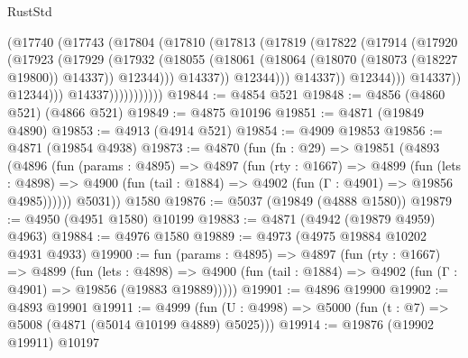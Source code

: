 \begin{lexlean}{RustStd}
\begin{coremodule}
                                  (@17740
                                    (@17743
                                      (@17804
                                        (@17810
                                          (@17813
                                            (@17819
                                              (@17822
                                                (@17914
                                                  (@17920
                                                    (@17923
                                                      (@17929
                                                        (@17932
                                                          (@18055
                                                            (@18061
                                                              (@18064
                                                                (@18070
                                                                  (@18073 (@18227 @19800))
                                                                  @14337))
                                                              @12344)))
                                                        @14337))
                                                    @12344)))
                                              @14337))
                                          @12344)))
                                    @14337))
                                @12344)))
                          @14337)))))))))))
@19844 := @4854 @521
@19848 := @4856 (@4860 @521) (@4866 @521)
@19849 := @4875 @10196
@19851 := @4871 (@19849 @4890)
@19853 := @4913 (@4914 @521)
@19854 := @4909 @19853
@19856 := @4871 (@19854 @4938)
@19873 := @4870
    (fun (fn : @29) =>
    @19851
      (@4893
        (@4896
          (fun (params : @4895) =>
          @4897
            (fun (rty : @1667) =>
            @4899
              (fun (lets : @4898) =>
              @4900 (fun (tail : @1884) => @4902 (fun (Γ : @4901) => @19856 @4985))))))
        @5031))
    @1580
@19876 := @5037 (@19849 (@4888 @1580))
@19879 := @4950 (@4951 @1580) @10199
@19883 := @4871 (@4942 (@19879 @4959) @4963)
@19884 := @4976 @1580
@19889 := @4973 (@4975 @19884 @10202 @4931 @4933)
@19900 := fun (params : @4895) =>
  @4897
    (fun (rty : @1667) =>
    @4899
      (fun (lets : @4898) =>
      @4900 (fun (tail : @1884) => @4902 (fun (Γ : @4901) => @19856 (@19883 @19889)))))
@19901 := @4896 @19900
@19902 := @4893 @19901
@19911 := @4999
    (fun (U : @4998) => @5000 (fun (t : @7) => @5008 (@4871 (@5014 @10199 @4889) @5025)))
@19914 := @19876 (@19902 @19911) @10197

\end{coremodule}
\end{lexlean}

